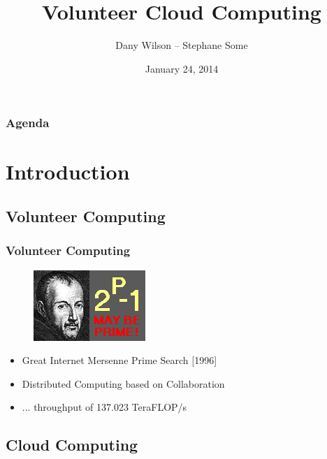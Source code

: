 \documentclass{beamer}
\title[Volunteer Cloud Computing]{Volunteer Cloud Computing}
\author{Dany Wilson -- Stephane Some}
\institute{University of Ottawa}
\date{January 24, 2014}
\begin{document}
\begin{frame}
\titlepage
\end{frame}

\begin{frame}
  \frametitle{Agenda}
  \tableofcontents
\end{frame}

\section{Introduction}
\subsection{Volunteer Computing}
\begin{frame}
  \frametitle{Volunteer Computing}
  \begin{figure}[GIMPS]
    \includegraphics{GIMPS_logo.png}
  \end{figure}

  \begin{itemize}
  \item Great Internet Mersenne Prime Search [1996]
  \item Distributed Computing based on Collaboration
  \item ... throughput of 137.023 TeraFLOP/s
  \end{itemize}
\end{frame}

\subsection{Cloud Computing}
\end{document}
